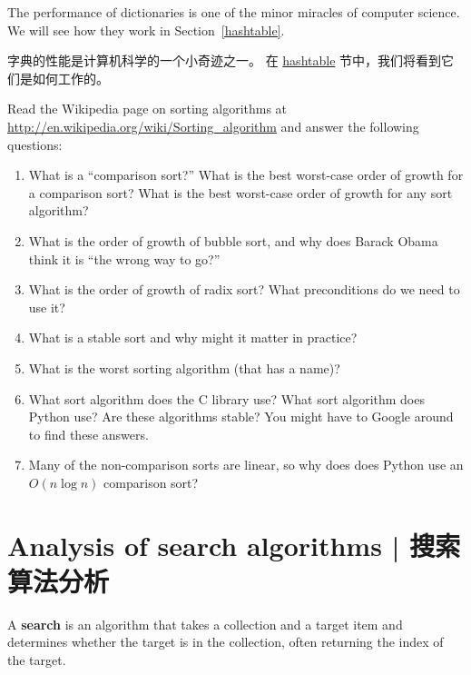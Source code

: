 The performance of dictionaries is one of the minor miracles of
computer science.  We will see how they work in
Section~\ref{hashtable}.

字典的性能是计算机科学的一个小奇迹之一。
在 \hyperref[hashtable]{hashtable} 节中，我们将看到它们是如何工作的。

\begin{exercise}

Read the Wikipedia page on sorting algorithms at
\url{http://en.wikipedia.org/wiki/Sorting_algorithm} and answer
the following questions:

\begin{enumerate}

\item What is a ``comparison sort?'' What is the best worst-case order
  of growth for a comparison sort?  What is the best worst-case order
  of growth for any sort algorithm?

\item What is the order of growth of bubble sort, and why does Barack
  Obama think it is ``the wrong way to go?''

\item What is the order of growth of radix sort?  What preconditions
  do we need to use it?

\item What is a stable sort and why might it matter in practice?

\item What is the worst sorting algorithm (that has a name)?

\item What sort algorithm does the C library use?  What sort algorithm
  does Python use?  Are these algorithms stable?  You might have to
  Google around to find these answers.

\item Many of the non-comparison sorts are linear, so why does does
  Python use an $O(n \log n)$ comparison sort?

\end{enumerate}

\end{exercise}


\section{Analysis of search algorithms  |  搜索算法分析}

A {\bf search} is an algorithm that takes a collection and a target
item and determines whether the target is in the collection, often
returning the index of the target.

